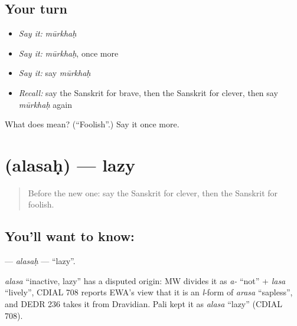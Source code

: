 \subsection*{Your turn}
\begin{itemize}
\raggedright
  \item \emph{Say it:} \emph{mūrkhaḥ}
  \item \emph{Say it:} \emph{mūrkhaḥ}, once more
  \item \emph{Say it:} say \emph{mūrkhaḥ}
  \item \emph{Recall:} say the Sanskrit for brave, then the Sanskrit for clever, then say \emph{mūrkhaḥ} again
\end{itemize}

\begin{tcolorbox}[breakable,colback=teal!4,colframe=teal!35!black,title={Before you move on}]
What does  mean? (\textquotedblleft{}Foolish\textquotedblright{}.) Say it once more.
\end{tcolorbox}
\section[\texorpdfstring{\sk{अलसः} (alasaḥ)}{अलसः (alasaḥ)}]{ (alasaḥ) — lazy}

\label{lesson:SA-C130-alasah}



\begin{quote}
Before the new one: say the Sanskrit for clever, then the Sanskrit for foolish.
\end{quote}

\subsection*{You'll want to know: }
\textbf{} — \emph{alasaḥ} — \textquotedblleft{}lazy\textquotedblright{}.

\begin{cousinweb}
\emph{alasa} \textquotedblleft{}inactive, lazy\textquotedblright{} has a disputed origin: MW divides it as \emph{a-} \textquotedblleft{}not\textquotedblright{} + \emph{lasa} \textquotedblleft{}lively\textquotedblright{}, CDIAL 708 reports EWA's view that it is an \emph{l}-form of \emph{arasa} \textquotedblleft{}sapless\textquotedblright{}, and DEDR 236 takes it from Dravidian. Pali kept it as \emph{alasa} \textquotedblleft{}lazy\textquotedblright{} (CDIAL 708).
\end{cousinweb}

